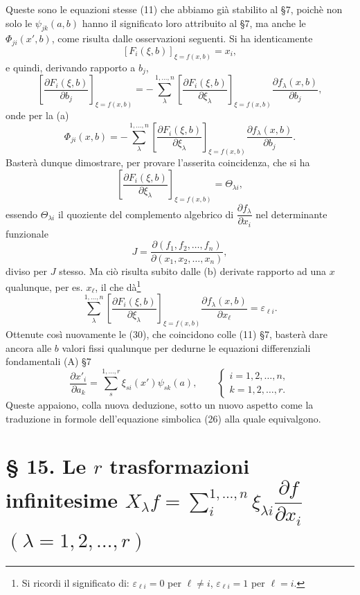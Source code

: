 \documentclass[11pt]{book}
\begin{document}
Queste sono le equazioni stesse (11) che abbiamo già stabilito al \S{}7, poichè non solo le $\psi_{jk}(a,b)$ hanno il significato loro attribuito al \S{}7, ma anche le $\Phi_{ji}(x',b)$, come risulta dalle osservazioni seguenti. Si ha identicamente
\begin{equation*}\tag{b}
 \left[F_i(\xi,b)\right]_{\xi=f(x,b)}=x_i,
\end{equation*}
e quindi, derivando rapporto a $b_j$,
\[
 \left[\frac{\partial F_i(\xi,b)}{\partial b_j}\right]_{\xi=f(x,b)}
 =-\sum\limits_\lambda^{1,\ldots,n}\left[\frac{\partial F_i(\xi,b)}{\partial\xi_\lambda}\right]_{\xi=f(x,b)}
 \frac{\partial f_\lambda(x,b)}{\partial b_j},
\]
onde per la (a)
\[
 \Phi_{ji}(x,b)= -\sum\limits_\lambda^{1,\ldots,n}\left[\frac{\partial F_i(\xi,b)}{\partial\xi_\lambda}\right]_{\xi=f(x,b)}
 \frac{\partial f_\lambda(x,b)}{\partial b_j}.
\]
Basterà dunque dimostrare, per provare l'asserita coincidenza, che si ha
\[
 \left[\frac{\partial F_i(\xi,b)}{\partial\xi_\lambda}\right]_{\xi=f(x,b)}=\Theta_{\lambda i},
\]
essendo $\Theta_{\lambda i}$ il quoziente del complemento algebrico di $\dfrac{\partial f_\lambda}{\partial x_i}$ nel determinante funzionale
\[
 J=\frac{\partial(f_1,f_2,\ldots,f_n)}{\partial(x_1,x_2,\ldots,x_n)},
\]
diviso per $J$ stesso. Ma ciò risulta subito dalle (b) derivate rapporto ad una $x$ qualunque, per es. $x_\ell$, il che dà\footnote{Si ricordi il significato di: $\varepsilon_{\ell i}=0$ per $\ell\ne i$, $\varepsilon_{\ell i}=1$ per $\ell=i$.}
\[
 \sum\limits_\lambda^{1,\ldots,n}\left[\frac{\partial F_i(\xi,b)}{\partial\xi_\lambda}\right]_{\xi=f(x,b)}
 \frac{\partial f_\lambda(x,b)}{\partial x_\ell}=\varepsilon_{\ell i}.
\]
Ottenute così nuovamente le (30), che coincidono colle (11) \S{}7, basterà dare ancora alle $b$ valori fissi qualunque per dedurne le equazioni differenziali fondamentali (A) \S{}7
\begin{equation*}\tag{A}
 \frac{\partial x'_i}{\partial a_k}=\sum\limits_s^{1,\ldots,r}\xi_{si}(x')\psi_{sk}(a),
 \qquad
 \begin{cases}
 i=1,2,\ldots,n,\\
 k=1,2,\ldots,r.
 \end{cases}
\end{equation*}
Queste appaiono, colla nuova deduzione, sotto un nuovo aspetto come la traduzione in formole dell'equazione simbolica (26) alla quale equivalgono.

\section*{\S{} 15. Le $r$ trasformazioni infinitesime $X_\lambda f=\sum\limits_i^{1,\ldots,n} \xi_{\lambda i}\dfrac{\partial f}{\partial x_i}$ $(\lambda=1,2,\ldots,r)$}
\end{document}
